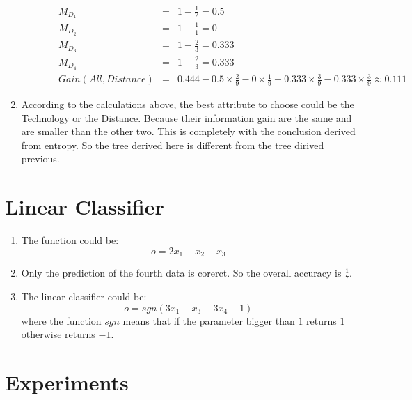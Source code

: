 \documentclass{article}[12pt]
\begin{document}
\begin{enumerate}
\begin{enumerate}
\begin{enumerate}
\begin{eqnarray}
							M_{D_1} &=& 1 - \frac{1}{2} = 0.5\nonumber \\
							M_{D_2} &=& 1 - \frac{1}{1} = 0\nonumber \\
							M_{D_3} &=& 1 - \frac{2}{3} = 0.333\nonumber \\
							M_{D_4} &=& 1 - \frac{2}{3} = 0.333\nonumber \\
							Gain(All, Distance) &=& 0.444 - 0.5 \times \frac{2}{9} - 0 \times \frac{1}{9} -0.333 \times \frac{3}{9} - 0.333 \times \frac{3}{9} \approx 0.111\nonumber 
						\end{eqnarray}
				\end{enumerate}
			\end{enumerate}
			\item According to the calculations above, the best attribute to choose could be the Technology or the Distance. Because their information gain are the same and are smaller than the other two. This is completely with the conclusion derived from entropy. So the tree derived here is different from the tree dirived previous.
		\end{enumerate}
	
	\section{Linear Classifier}
		\begin{enumerate} 
			\item The function could be:
				\begin{displaymath}	
					o = 2x_1 +x_2 -x_3
				\end{displaymath}
			\item Only the prediction of the fourth data is corerct. So the overall accuracy is $\frac{1}{7}$.
			\item The linear classifier could be:
				\begin{displaymath}
					o = sgn(3x_1 - x_3 + 3x_4 - 1)
				\end{displaymath}
				where the function $sgn$ means that if the parameter bigger than $1$ returns $1$ otherwise returns $-1$.
		\end{enumerate}
		
	\section{Experiments}
\end{document}
